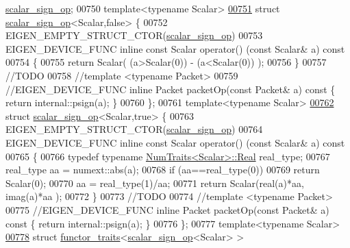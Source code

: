 \begin{DoxyCode}
      \hyperlink{struct_eigen_1_1internal_1_1scalar__sign__op}{scalar\_sign\_op};
00750 \textcolor{keyword}{template}<\textcolor{keyword}{typename} Scalar>
\hyperlink{struct_eigen_1_1internal_1_1scalar__sign__op_3_01_scalar_00_01false_01_4}{00751} \textcolor{keyword}{struct }\hyperlink{struct_eigen_1_1internal_1_1scalar__sign__op}{scalar\_sign\_op}<Scalar,false> \{
00752   EIGEN\_EMPTY\_STRUCT\_CTOR(\hyperlink{struct_eigen_1_1internal_1_1scalar__sign__op}{scalar\_sign\_op})
00753   EIGEN\_DEVICE\_FUNC \textcolor{keyword}{inline} \textcolor{keyword}{const} Scalar operator() (\textcolor{keyword}{const} Scalar& a)\textcolor{keyword}{ const}
00754 \textcolor{keyword}{  }\{
00755       \textcolor{keywordflow}{return} Scalar( (a>Scalar(0)) - (a<Scalar(0)) );
00756   \}
00757   \textcolor{comment}{//TODO}
00758   \textcolor{comment}{//template <typename Packet>}
00759   \textcolor{comment}{//EIGEN\_DEVICE\_FUNC inline Packet packetOp(const Packet& a) const \{ return internal::psign(a); \}}
00760 \};
00761 \textcolor{keyword}{template}<\textcolor{keyword}{typename} Scalar>
\hyperlink{struct_eigen_1_1internal_1_1scalar__sign__op_3_01_scalar_00_01true_01_4}{00762} \textcolor{keyword}{struct }\hyperlink{struct_eigen_1_1internal_1_1scalar__sign__op}{scalar\_sign\_op}<Scalar,true> \{
00763   EIGEN\_EMPTY\_STRUCT\_CTOR(\hyperlink{struct_eigen_1_1internal_1_1scalar__sign__op}{scalar\_sign\_op})
00764   EIGEN\_DEVICE\_FUNC \textcolor{keyword}{inline} \textcolor{keyword}{const} Scalar operator() (\textcolor{keyword}{const} Scalar& a)\textcolor{keyword}{ const}
00765 \textcolor{keyword}{  }\{
00766     \textcolor{keyword}{typedef} \textcolor{keyword}{typename} \hyperlink{group___core___module_struct_eigen_1_1_num_traits}{NumTraits<Scalar>::Real} real\_type;
00767     real\_type aa = numext::abs(a);
00768     \textcolor{keywordflow}{if} (aa==real\_type(0))
00769       \textcolor{keywordflow}{return} Scalar(0);
00770     aa = real\_type(1)/aa;
00771     \textcolor{keywordflow}{return} Scalar(real(a)*aa, imag(a)*aa );
00772   \}
00773   \textcolor{comment}{//TODO}
00774   \textcolor{comment}{//template <typename Packet>}
00775   \textcolor{comment}{//EIGEN\_DEVICE\_FUNC inline Packet packetOp(const Packet& a) const \{ return internal::psign(a); \}}
00776 \};
00777 \textcolor{keyword}{template}<\textcolor{keyword}{typename} Scalar>
\hyperlink{struct_eigen_1_1internal_1_1functor__traits_3_01scalar__sign__op_3_01_scalar_01_4_01_4}{00778} \textcolor{keyword}{struct }\hyperlink{struct_eigen_1_1internal_1_1functor__traits}{functor\_traits}<\hyperlink{struct_eigen_1_1internal_1_1scalar__sign__op}{scalar\_sign\_op}<Scalar> >

\end{DoxyCode}
